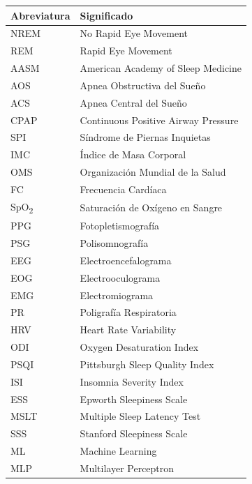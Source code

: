 \documentclass[a4paper,12pt,twoside]{memoir}
\begin{document}
\begin{longtable}{ll}
\textbf{Abreviatura} & \textbf{Significado} \\
\hline
NREM  & No Rapid Eye Movement \\
REM   & Rapid Eye Movement \\
AASM  & American Academy of Sleep Medicine \\
AOS   & Apnea Obstructiva del Sueño \\
ACS   & Apnea Central del Sueño \\
CPAP  & Continuous Positive Airway Pressure \\
SPI   & Síndrome de Piernas Inquietas \\
IMC   & Índice de Masa Corporal \\
OMS   & Organización Mundial de la Salud \\
FC    & Frecuencia Cardíaca \\
SpO\textsubscript{2} & Saturación de Oxígeno en Sangre \\
PPG   & Fotopletismografía \\
PSG   & Polisomnografía \\
EEG   & Electroencefalograma \\
EOG   & Electrooculograma \\
EMG   & Electromiograma \\
PR    & Poligrafía Respiratoria \\
HRV   & Heart Rate Variability \\
ODI   & Oxygen Desaturation Index \\
PSQI  & Pittsburgh Sleep Quality Index \\
ISI   & Insomnia Severity Index \\
ESS   & Epworth Sleepiness Scale \\
MSLT  & Multiple Sleep Latency Test \\
SSS   & Stanford Sleepiness Scale \\
ML    & Machine Learning \\
MLP   & Multilayer Perceptron \\
\end{longtable}



\mainmatter











\end{document}
